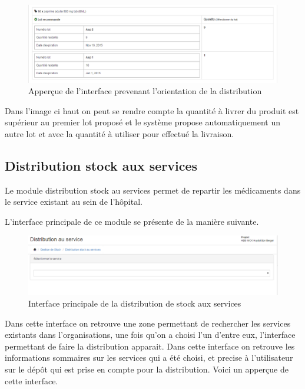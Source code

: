 \documentclass[12pt,a4paper]{report}
\begin{document}
\begin{figure}[h]
\begin{center}
\includegraphics[width=14cm]{pic/AstuceDistribution.png}
\end{center}
\caption{Apperçue de l'interface prevenant l'orientation de la distribution}
\label{Apperçue de l'interface prevenant l'orientation de la distribution}
\end{figure}

Dans l'image ci haut on peut se rendre compte la quantité à livrer du produit est supérieur au premier lot proposé et le système propose automatiquement un autre lot et avec la quantité à utiliser pour effectué la livraison.

\newpage
\subsection{Distribution stock aux services}
Le module distribution stock au services permet de repartir les médicaments dans le service existant au sein de l'hôpital.

L'interface principale de ce module se présente de la manière suivante. 

\begin{figure}[h]
\begin{center}
\includegraphics[width=14cm]{pic/DistService.png}
\end{center}
\caption{Interface principale de la distribution de stock aux services}
\label{Interface principale de la distribution de stock aux services}
\end{figure}


Dans cette interface on retrouve une zone permettant de rechercher les services existants dans l'organisations, une fois qu'on a choisi l'un d'entre eux, l'interface permettant de faire la distribution apparait. Dans cette interface on retrouve les informations sommaires sur les services qui a été choisi, et precise à l'utilisateur sur le dépôt qui est prise en compte pour la distribution. Voici un apperçue de cette interface.
\end{document}
